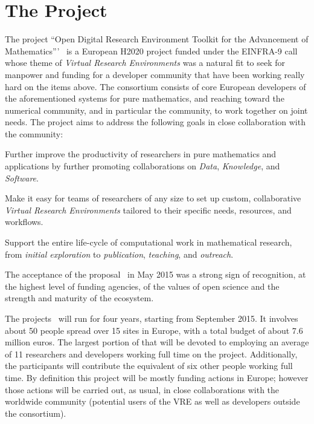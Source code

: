 \section{The \ODK Project}
The project ``Open Digital Research Environment Toolkit for the Advancement of
Mathematics'''~\cite{OpenDreamKit:on} is a European H2020 project funded under the
EINFRA-9 call~\cite{EINFRA-9} whose theme of \emph{Virtual Research Environments} was a
natural fit to seek for manpower and funding for a developer community that have been
working really hard on the items above. The \ODK consortium consists of core European
developers of the aforementioned systems for pure mathematics, and reaching toward the
numerical community, and in particular the \Jupyter community, to work together on joint
needs. The project aims to address the following goals in close collaboration with the
community:
\begin{compactenum}
\item Further improve the productivity of researchers in pure mathematics and applications
  by further promoting collaborations on \emph{Data}, \emph{Knowledge}, and
  \emph{Software}.
\item Make it easy for teams of researchers of any size to set up custom, collaborative
  \emph{Virtual Research Environments} tailored to their specific needs, resources, and
  workflows.
\item Support the entire life-cycle of computational work in mathematical research, from
  \emph{initial exploration} to \emph{publication}, \emph{teaching}, and \emph{outreach}.
\end{compactenum}
The acceptance of the proposal~\cite{ODKproposal:on} in May 2015 was a strong sign of
recognition, at the highest level of funding agencies, of the values of open science and
the strength and maturity of the ecosystem.

The \ODK projects~\cite{ODKproposal:on} will run for four years, starting from September
2015. It involves about 50 people spread over 15 sites in Europe, with a total budget of
about 7.6 million euros. The largest portion of that will be devoted to employing an
average of 11 researchers and developers working full time on the project. Additionally,
the participants will contribute the equivalent of six other people working full time.  By
definition this project will be mostly funding actions in Europe; however those actions
will be carried out, as usual, in close collaborations with the worldwide community
(potential users of the VRE as well as developers outside the \ODK consortium).

